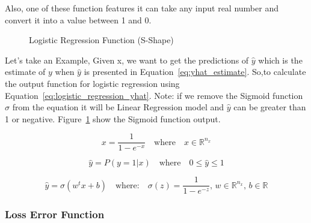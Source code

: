 Also, one of these function features it can take any input real number and convert it into a value between 1 and 0.
\begin{figure}
\centering

\caption{Logistic Regression Function (S-Shape)}\label{Fig:Logistic}
\end{figure}


Let's take an Example, Given x, we want to get the predictions of $\widehat{y}$ which is the estimate of $y$  when $\widehat{y}$  is presented in Equation~\eqref{eq:yhat_estimate}. So,to calculate the output function for logistic regression using Equation~\eqref{eq:logistic_regression_yhat}. Note: if we remove the Sigmoid function $\sigma$ from the equation it will be Linear Regression model and $\widehat{y}$ can be greater than 1 or negative. Figure~\ref{Fig:Logistic} show the Sigmoid function output. 

\begin{equation}\label{eq:logistic_function}
  x = \frac{1}{1-e^{-x}} \quad \text{where} \quad x \in \mathbb{R}^{n_x} 
\end{equation}

\begin{equation}
  \label{eq:yhat_estimate}
    \widehat{y} = P(y=1 | x) \quad \text{where}  \quad 0 \le \widehat{y}  \le 1
  \end{equation}

\begin{equation}
  \label{eq:logistic_regression_yhat}
  \widehat{y} = \sigma(w^t x + b)  \quad \text{where:} \quad  \sigma(z) = \frac{1}{1-e^{-z}} \text{, }  w \in  \mathbb{R}^{n_x} \text{, }  b \in  \mathbb{R}  
\end{equation}


\subsubsection{Loss Error Function}

